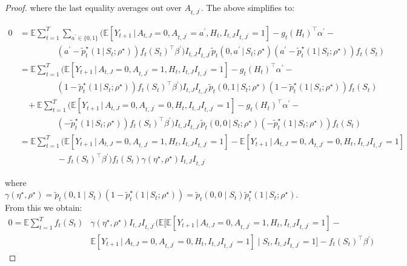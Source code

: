 \documentclass[supplementary, lineno]{biometrika}
\def\E{\mathbb{E}}
\def\given{\, | \,}
\begin{document}
\begin{proof}
where the last equality averages out over $A_{t,J^\prime}$. The above simplifies to:

\begin{align*}
    0 &= \E \sum_{t=1}^T \sum_{a^\prime \in \{0,1\}} \Big(\E \left[Y_{t+1} \given{A_{t,J}=0,A_{t,J^\prime}=a^\prime, H_t ,I_{t,J}I_{t,J^\prime}=1} \right]- g_t(H_t)^\top\alpha^\prime- \nonumber \\
    &  ~~~~~~~~~~~~~~~~~~~~  (a^\prime - \tilde p_t^\star (1 \given S_t;\rho^\star) ) f_t (S_t)^\top \beta^\prime \Big) I_{t,J}I_{t,J^\prime}\tilde p_t (0,a^\prime \given S_t;\rho^\star)(a^\prime - \tilde {p}^\star_t (1 \given S_t;\rho^\star) ) f_t (S_t) \nonumber \\
    &= \E \sum_{t=1}^T  \Big(\E \left[Y_{t+1} \given{A_{t,J}=0,A_{t,J^\prime}=1, H_t ,I_{t,J}I_{t,J^\prime}=1} \right]- g_t(H_t)^\top\alpha^\prime- \nonumber \\
    &  ~~~~~~~~~~~~~~~~~~~~  (1 - \tilde p_t^\star (1 \given S_t;\rho^\star) ) f_t (S_t)^\top \beta^\prime \Big) I_{t,J}I_{t,J^\prime}\tilde p_t (0,1 \given S_t;\rho^\star)(1 - \tilde {p}^\star_t (1 \given S_t;\rho^\star) ) f_t (S_t) \nonumber \\
    & ~~~~ +\E \sum_{t=1}^T \Big(\E \left[Y_{t+1} \given{A_{t,J}=0,A_{t,J^\prime}=0, H_t ,I_{t,J}I_{t,J^\prime}=1} \right]- g_t(H_t)^\top\alpha^\prime- \nonumber \\
    &  ~~~~~~~~~~~~~~~~~~~~  ( - \tilde p_t^\star (1 \given S_t;\rho^\star) ) f_t (S_t)^\top \beta^\prime \Big) I_{t,J}I_{t,J^\prime}\tilde p_t (0,0 \given S_t;\rho^\star)( - \tilde {p}^\star_t (1 \given S_t;\rho^\star) ) f_t (S_t) \nonumber \\
    &= \E \sum_{t=1}^T \Big(\E \left[Y_{t+1} \given{A_{t,J}=0,A_{t,J^\prime}=1, H_t ,I_{t,J}I_{t,J^\prime}=1} \right] - \E \left[Y_{t+1} \given{A_{t,J}=0,A_{t,J^\prime}=0, H_t ,I_{t,J}I_{t,J^\prime}=1} \right]\nonumber \\
    &  ~~~~~~~~~~~~~~~~~~~~  -f_t (S_t)^\top \beta^\prime \Big)  f_t (S_t) \gamma(\eta^\star,\rho^\star) I_{t,J}I_{t,J^\prime}
\end{align*}

where $\gamma(\eta^\star,\rho^\star) = \tilde{p}_t (0,1 \mid S_t)(1- \tilde {p}^\star_t (1 \given S_t;\rho^\star)) = \tilde{p}_t (0,0 \mid S_t) \tilde {p}^\star_t (1 \given S_t;\rho^\star) $. From this we obtain:
\begin{align*}
   0 = \E \sum_{t=1}^T  f_t (S_t) &\gamma(\eta^\star,\rho^\star) I_{t,J}I_{t,J^\prime}   \Big(\E \Big[\E \left[Y_{t+1} \given{A_{t,J}=0,A_{t,J^\prime}=1, H_t ,I_{t,J}I_{t,J^\prime}=1} \right] - \nonumber \\
   &\E \left[Y_{t+1} \given{A_{t,J}=0,A_{t,J^\prime}=0, H_t ,I_{t,J}I_{t,J^\prime}=1} \right] \mid S_t,I_{t,J}I_{t,J^\prime}=1\Big]  -f_t (S_t)^\top \beta^\prime \Big)
\end{align*}


\end{proof}
\end{document}
